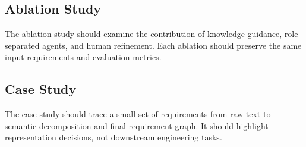 \subsection{Ablation Study}
\label{sec:exp-ablation}

The ablation study should examine the contribution of knowledge guidance, role-separated agents, and human refinement.
Each ablation should preserve the same input requirements and evaluation metrics.

\subsection{Case Study}
\label{sec:exp-case-study}

The case study should trace a small set of requirements from raw text to semantic decomposition and final requirement graph.
It should highlight representation decisions, not downstream engineering tasks.

